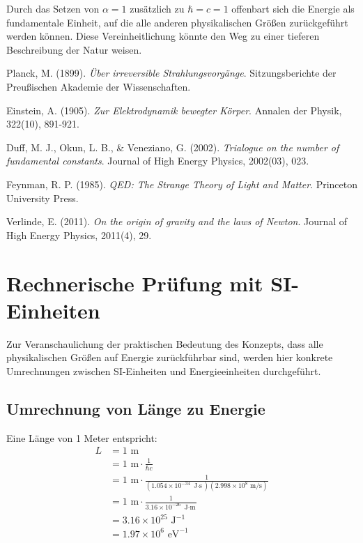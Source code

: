 \documentclass{article}
\begin{document}
	Durch das Setzen von $\alpha = 1$ zusätzlich zu $\hbar = c = 1$ offenbart sich die Energie als fundamentale Einheit, auf die alle anderen physikalischen Größen zurückgeführt werden können. Diese Vereinheitlichung könnte den Weg zu einer tieferen Beschreibung der Natur weisen.
	
	\begin{thebibliography}{5}
		Planck, M. (1899).
		\textit{Über irreversible Strahlungsvorgänge}.
		Sitzungsberichte der Preußischen Akademie der Wissenschaften.
		
		Einstein, A. (1905).
		\textit{Zur Elektrodynamik bewegter Körper}.
		Annalen der Physik, 322(10), 891-921.
		
		Duff, M. J., Okun, L. B., \& Veneziano, G. (2002).
		\textit{Trialogue on the number of fundamental constants}.
		Journal of High Energy Physics, 2002(03), 023.
		
		Feynman, R. P. (1985).
		\textit{QED: The Strange Theory of Light and Matter}.
		Princeton University Press.
		
		Verlinde, E. (2011).
		\textit{On the origin of gravity and the laws of Newton}.
		Journal of High Energy Physics, 2011(4), 29.
	\end{thebibliography}
	
	\appendix
	\section{Rechnerische Prüfung mit SI-Einheiten}
	
	Zur Veranschaulichung der praktischen Bedeutung des Konzepts, dass alle physikalischen Größen auf Energie zurückführbar sind, werden hier konkrete Umrechnungen zwischen SI-Einheiten und Energieeinheiten durchgeführt.
	
	\subsection{Umrechnung von Länge zu Energie}
	
	Eine Länge von 1 Meter entspricht:
	\begin{align}
		L &= 1 \text{ m} \\
		&= 1 \text{ m} \cdot \frac{1}{\hbar c} \\
		&= 1 \text{ m} \cdot \frac{1}{(1.054 \times 10^{-34} \text{ J$\cdot$s})(2.998 \times 10^8 \text{ m/s})} \\
		&= 1 \text{ m} \cdot \frac{1}{3.16 \times 10^{-26} \text{ J$\cdot$m}} \\
		&= 3.16 \times 10^{25} \text{ J}^{-1} \\
		&= 1.97 \times 10^{6} \text{ eV}^{-1}
	\end{align}
	
\end{document}
